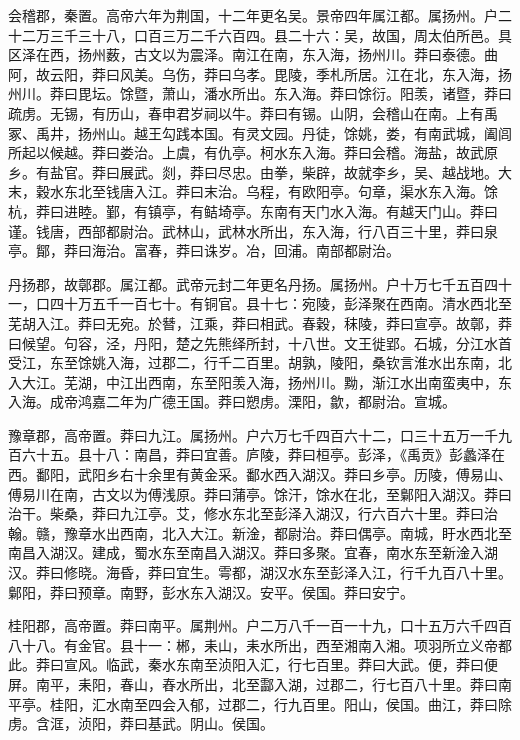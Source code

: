 \documentclass[12pt,UTF8]{ctexbook}
\begin{document}
会稽郡，秦置。高帝六年为荆国，十二年更名吴。景帝四年属江都。属扬州。户二十二万三千三十八，口百三万二千六百四。县二十六：吴，故国，周太伯所邑。具区泽在西，扬州薮，古文以为震泽。南江在南，东入海，扬州川。莽曰泰德。曲阿，故云阳，莽曰风美。乌伤，莽曰乌孝。毘陵，季札所居。江在北，东入海，扬州川。莽曰毘坛。馀暨，萧山，潘水所出。东入海。莽曰馀衍。阳羡，诸暨，莽曰疏虏。无锡，有历山，春申君岁祠以牛。莽曰有锡。山阴，会稽山在南。上有禹冢、禹井，扬州山。越王勾践本国。有灵文园。丹徒，馀姚，娄，有南武城，阖闾所起以候越。莽曰娄治。上虞，有仇亭。柯水东入海。莽曰会稽。海盐，故武原乡。有盐官。莽曰展武。剡，莽曰尽忠。由拳，柴辟，故就李乡，吴、越战地。大末，穀水东北至钱唐入江。莽曰末治。乌程，有欧阳亭。句章，渠水东入海。馀杭，莽曰进睦。鄞，有镇亭，有鲒埼亭。东南有天门水入海。有越天门山。莽曰谨。钱唐，西部都尉治。武林山，武林水所出，东入海，行八百三十里，莽曰泉亭。鄮，莽曰海治。富春，莽曰诛岁。冶，回浦。南部都尉治。



丹扬郡，故鄣郡。属江都。武帝元封二年更名丹扬。属扬州。户十万七千五百四十一，口四十万五千一百七十。有铜官。县十七：宛陵，彭泽聚在西南。清水西北至芜胡入江。莽曰无宛。於朁，江乘，莽曰相武。春穀，秣陵，莽曰宣亭。故鄣，莽曰候望。句容，泾，丹阳，楚之先熊绎所封，十八世。文王徙郢。石城，分江水首受江，东至馀姚入海，过郡二，行千二百里。胡孰，陵阳，桑钦言淮水出东南，北入大江。芜湖，中江出西南，东至阳羡入海，扬州川。黝，渐江水出南蛮夷中，东入海。成帝鸿嘉二年为广德王国。莽曰愬虏。溧阳，歙，都尉治。宣城。



豫章郡，高帝置。莽曰九江。属扬州。户六万七千四百六十二，口三十五万一千九百六十五。县十八：南昌，莽曰宜善。庐陵，莽曰桓亭。彭泽，《禹贡》彭蠡泽在西。鄱阳，武阳乡右十余里有黄金采。鄱水西入湖汉。莽曰乡亭。历陵，傅易山、傅易川在南，古文以为傅浅原。莽曰蒲亭。馀汗，馀水在北，至鄡阳入湖汉。莽曰治干。柴桑，莽曰九江亭。艾，修水东北至彭泽入湖汉，行六百六十里。莽曰治翰。赣，豫章水出西南，北入大江。新淦，都尉治。莽曰偶亭。南城，盱水西北至南昌入湖汉。建成，蜀水东至南昌入湖汉。莽曰多聚。宜春，南水东至新淦入湖汉。莽曰修晓。海昏，莽曰宜生。雩都，湖汉水东至彭泽入江，行千九百八十里。鄡阳，莽曰预章。南野，彭水东入湖汉。安平。侯国。莽曰安宁。



桂阳郡，高帝置。莽曰南平。属荆州。户二万八千一百一十九，口十五万六千四百八十八。有金官。县十一：郴，耒山，耒水所出，西至湘南入湘。项羽所立义帝都此。莽曰宣风。临武，秦水东南至浈阳入汇，行七百里。莽曰大武。便，莽曰便屏。南平，耒阳，春山，舂水所出，北至酃入湖，过郡二，行七百八十里。莽曰南平亭。桂阳，汇水南至四会入郁，过郡二，行九百里。阳山，侯国。曲江，莽曰除虏。含洭，浈阳，莽曰基武。阴山。侯国。
\end{document}
